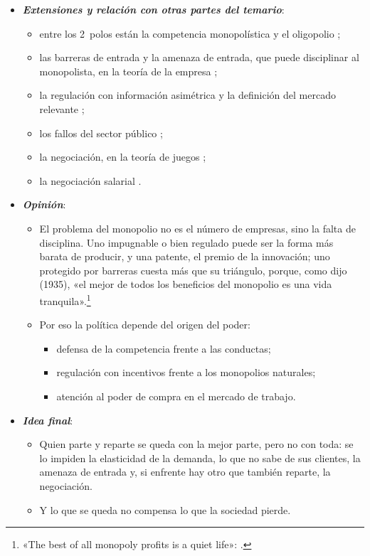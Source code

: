 \documentclass[11pt]{article}
\begin{document}
\begin{itemize}
\begin{itemize}
  \item El poder de mercado ha vuelto al centro del debate con la evidencia de márgenes crecientes\nocite{DeLoeckerEeckhoutUnger2020Rise} y de su relación con el estancamiento de los salarios\nocite{DebEtAl2022Wage}.
  \end{itemize}
\item \textbf{\emph{Extensiones y relación con otras partes del temario}}:
  \begin{itemize}
  \item entre los 2~polos están la competencia monopolística  y el oligopolio ;
  \item las barreras de entrada y la amenaza de entrada, que puede disciplinar al monopolista, en la teoría de la empresa ;
  \item la regulación con información asimétrica y la definición del mercado relevante ;
  \item los fallos del sector público ;
  \item la negociación, en la teoría de juegos ;
  \item la negociación salarial .
  \end{itemize}
\item \textbf{\emph{Opinión}}:
  \begin{itemize}
  \item El problema del monopolio no es el número de empresas, sino la falta de disciplina. Uno impugnable o bien regulado puede ser la forma más barata de producir, y una patente, el premio de la innovación; uno protegido por barreras cuesta más que su triángulo, porque, como dijo  (1935), «el mejor de todos los beneficios del monopolio es una vida tranquila».\footnote{«The best of all monopoly profits is a quiet life»: \textcite[8]{Hicks1935Annual}.}
  \item Por eso la política depende del origen del poder:
  \begin{itemize}
  \item defensa de la competencia frente a las conductas;
  \item regulación con incentivos frente a los monopolios naturales;
  \item atención al poder de compra en el mercado de trabajo.
  \end{itemize}
  \end{itemize}
\item \textbf{\emph{Idea final}}:
  \begin{itemize}
  \item Quien parte y reparte se queda con la mejor parte, pero no con toda: se lo impiden la elasticidad de la demanda, lo que no sabe de sus clientes, la amenaza de entrada y, si enfrente hay otro que también reparte, la negociación.

  \item Y lo que se queda no compensa lo que la sociedad pierde.
  \end{itemize}
\end{itemize}
\end{document}
